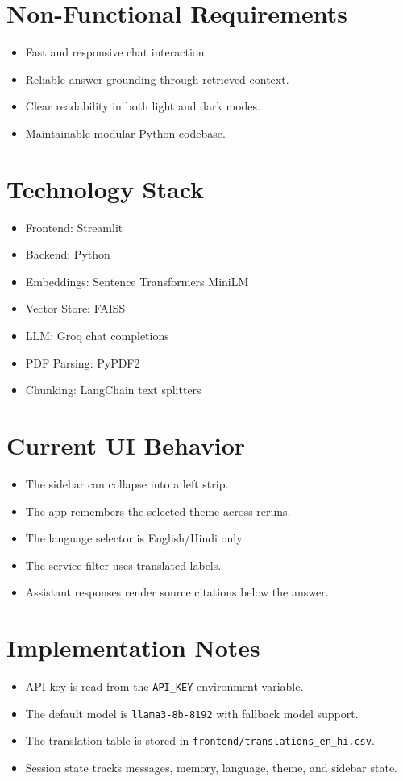 \documentclass[11pt]{article}
\begin{document}
\section{Non-Functional Requirements}
\begin{itemize}
    \item Fast and responsive chat interaction.
    \item Reliable answer grounding through retrieved context.
    \item Clear readability in both light and dark modes.
    \item Maintainable modular Python codebase.
\end{itemize}

\section{Technology Stack}
\begin{itemize}
    \item Frontend: Streamlit
    \item Backend: Python
    \item Embeddings: Sentence Transformers MiniLM
    \item Vector Store: FAISS
    \item LLM: Groq chat completions
    \item PDF Parsing: PyPDF2
    \item Chunking: LangChain text splitters
\end{itemize}

\section{Current UI Behavior}
\begin{itemize}
    \item The sidebar can collapse into a left strip.
    \item The app remembers the selected theme across reruns.
    \item The language selector is English/Hindi only.
    \item The service filter uses translated labels.
    \item Assistant responses render source citations below the answer.
\end{itemize}

\section{Implementation Notes}
\begin{itemize}
    \item API key is read from the \texttt{API\_KEY} environment variable.
    \item The default model is \texttt{llama3-8b-8192} with fallback model support.
    \item The translation table is stored in \texttt{frontend/translations\_en\_hi.csv}.
    \item Session state tracks messages, memory, language, theme, and sidebar state.
\end{itemize}
\end{document}
